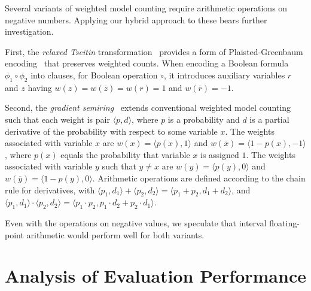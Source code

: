 \documentclass[letterpaper,USenglish,cleveref, autoref, thm-restate]{lipics-v2021}
\newcommand{\obar}[1]{\overline{#1}}
\begin{document}
Several variants of weighted model counting require
arithmetic operations on negative numbers.  Applying our hybrid approach to these bears further investigation.

First,
the \emph{relaxed Tseitin}
transformation~\cite{meert:starai:2016} provides  a form
of Plaisted-Green\-baum encoding~\cite{plaisted:jsc:1986} that preserves
weighted counts.  When encoding a Boolean formula $\phi_1 \circ \phi_2$ into clauses,
for Boolean operation $\circ$,
it introduces auxiliary variables $r$ and $z$ having
$w(z) = w(\obar{z}) = w(r) = 1$ and $w(\obar{r}) = -1$.

Second, the \emph{gradient
semiring}~\cite{eisner:acl:2002, kimmig:jal:2017,maene:aaai:2025} extends conventional weighted
model counting such that each weight is pair $\langle p, d \rangle$,
where $p$ is a probability and $d$ is a partial derivative of the
probability with respect to some variable $x$.  The weights
associated with variable $x$ are $w(x) = \langle p(x), 1\rangle$ and
$w(\obar{x}) = \langle 1-p(x), -1\rangle$, where $p(x)$ equals the probability that variable $x$ is assigned $1$.
The weights associated with variable $y$ such that $y \not = x$ are
$w(y) = \langle p(y), 0\rangle$ and
$w(\obar{y}) = \langle 1-p(y), 0\rangle$.  Arithmetic operations are defined according to the chain rule for derivatives,
with $\langle p_1, d_1\rangle + \langle p_2, d_2\rangle = \langle p_1 + p_2, d_1 + d_2\rangle$, and
$\langle p_1, d_1\rangle \cdot \langle p_2, d_2\rangle = \langle p_1 \cdot p_2, p_1 \cdot d_2 + p_2 \cdot d_1\rangle$.

Even with the operations on negative values, we speculate that interval floating-point arithmetic would perform well for both variants.


\newpage


\newpage
\appendix

\section{Analysis of Evaluation Performance}
\label{app:performance}
\end{document}

